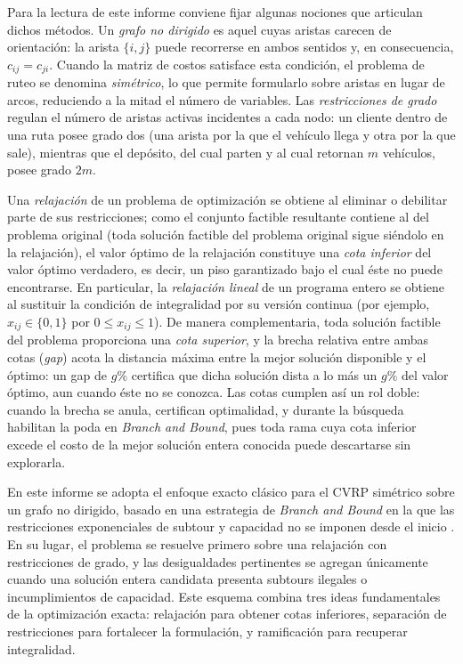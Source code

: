 Para la lectura de este informe conviene fijar algunas nociones que articulan
dichos métodos. Un \textit{grafo no dirigido} es aquel cuyas aristas carecen de
orientación: la arista $\{i,j\}$ puede recorrerse en ambos sentidos y, en
consecuencia, $c_{ij}=c_{ji}$. Cuando la matriz de costos satisface esta
condición, el problema de ruteo se denomina \textit{simétrico}, lo que permite
formularlo sobre aristas en lugar de arcos, reduciendo a la mitad el número de
variables. Las \textit{restricciones de grado} regulan el número de aristas
activas incidentes a cada nodo: un cliente dentro de una ruta posee grado dos
(una arista por la que el vehículo llega y otra por la que sale), mientras que
el depósito, del cual parten y al cual retornan $m$ vehículos, posee grado $2m$.

Una \textit{relajación} de un problema de optimización se obtiene al eliminar o
debilitar parte de sus restricciones; como el conjunto factible resultante contiene al del problema original
(toda solución factible del problema original sigue siéndolo en la
relajación), el valor óptimo de la relajación constituye una \textit{cota
inferior} del valor óptimo verdadero, es decir, un piso
garantizado bajo el cual éste no puede encontrarse. En particular, la
\textit{relajación lineal} de un programa entero se obtiene al sustituir la
condición de integralidad por su versión continua (por ejemplo,
$x_{ij}\in\{0,1\}$ por $0 \le x_{ij} \le 1$). De manera complementaria, toda solución factible del problema proporciona una
\textit{cota superior}, y la brecha relativa entre ambas cotas (\textit{gap})
acota la distancia máxima entre la mejor solución disponible y el óptimo: un
gap de $g\%$ certifica que dicha solución dista a lo más un $g\%$ del valor
óptimo, aun cuando éste no se conozca. Las cotas cumplen así un rol doble:
cuando la brecha se anula, certifican optimalidad, y durante la búsqueda
habilitan la poda en \textit{Branch and Bound}, pues toda rama cuya cota
inferior excede el costo de la mejor solución entera conocida puede descartarse
sin explorarla.

En este informe se adopta el enfoque exacto clásico para el CVRP simétrico
sobre un grafo no dirigido, basado en una estrategia de \textit{Branch and
Bound} en la que las restricciones exponenciales de subtour y capacidad no se
imponen desde el inicio \parencite{laporte1983branch}. En su lugar, el problema
se resuelve primero sobre una relajación con restricciones de grado, y las
desigualdades pertinentes se agregan únicamente cuando una solución entera
candidata presenta subtours ilegales o incumplimientos de capacidad. Este
esquema combina tres ideas fundamentales de la optimización exacta: relajación
para obtener cotas inferiores, separación de restricciones para fortalecer la
formulación, y ramificación para recuperar integralidad.

